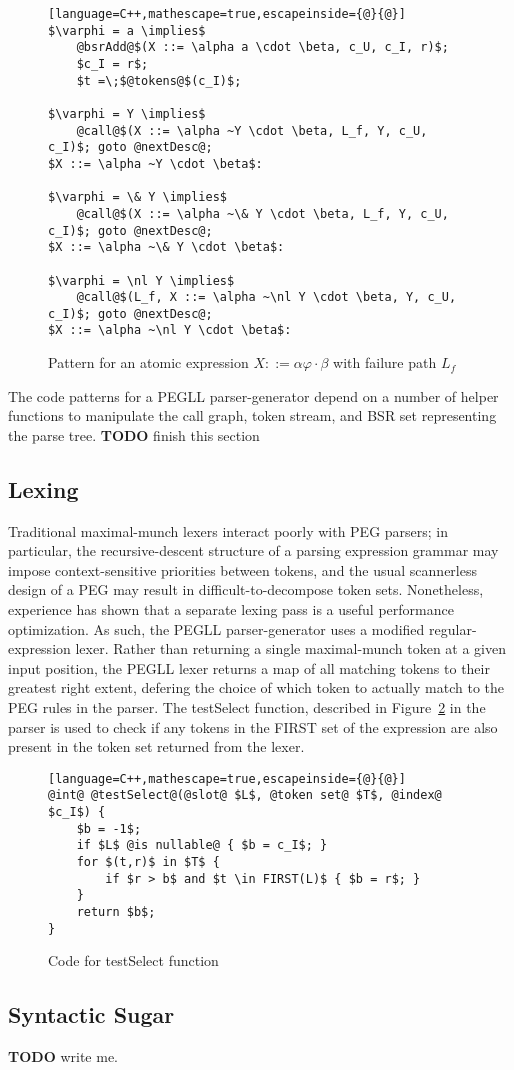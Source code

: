 \documentclass{article}
\newcommand{\nl}{\mathord{!}}
\begin{document}
\begin{figure}
\caption[Atomic expression code patterns]{Pattern for an atomic expression $X ::= \alpha \varphi \cdot \beta$ with failure path $L_f$} \label{atom-expr-pattern}
\begin{lstlisting}[language=C++,mathescape=true,escapeinside={@}{@}]
$\varphi = a \implies$
	@bsrAdd@$(X ::= \alpha a \cdot \beta, c_U, c_I, r)$;
	$c_I = r$;
	$t =\;$@tokens@$(c_I)$;

$\varphi = Y \implies$
	@call@$(X ::= \alpha ~Y \cdot \beta, L_f, Y, c_U, c_I)$; goto @nextDesc@;
$X ::= \alpha ~Y \cdot \beta$:

$\varphi = \& Y \implies$
	@call@$(X ::= \alpha ~\& Y \cdot \beta, L_f, Y, c_U, c_I)$; goto @nextDesc@;
$X ::= \alpha ~\& Y \cdot \beta$:

$\varphi = \nl Y \implies$
	@call@$(L_f, X ::= \alpha ~\nl Y \cdot \beta, Y, c_U, c_I)$; goto @nextDesc@;
$X ::= \alpha ~\nl Y \cdot \beta$:
\end{lstlisting}
\end{figure}

The code patterns for a PEGLL parser-generator depend on a number of helper functions to manipulate the call graph, token stream, and BSR set representing the parse tree. 
\textbf{TODO} finish this section

\subsection{Lexing}
Traditional maximal-munch lexers interact poorly with PEG parsers; in particular, the recursive-descent structure of a parsing expression grammar may impose context-sensitive priorities between tokens, and the usual scannerless design of a PEG may result in difficult-to-decompose token sets. 
Nonetheless, experience \cite{Ack19,Lau19} has shown that a separate lexing pass is a useful performance optimization.
As such, the PEGLL parser-generator uses a modified regular-expression lexer. 
Rather than returning a single maximal-munch token at a given input position, the PEGLL lexer returns a map of all matching tokens to their greatest right extent, defering the choice of which token to actually match to the PEG rules in the parser. 
The testSelect function, described in Figure~\ref{test-select} in the parser is used to check if any tokens in the FIRST set of the expression \cite{Red09} are also present in the token set returned from the lexer.

\begin{figure}
\caption[testSelect]{Code for testSelect function} \label{test-select}
\begin{lstlisting}[language=C++,mathescape=true,escapeinside={@}{@}]
@int@ @testSelect@(@slot@ $L$, @token set@ $T$, @index@ $c_I$) {
	$b = -1$;
	if $L$ @is nullable@ { $b = c_I$; }
	for $(t,r)$ in $T$ {
		if $r > b$ and $t \in FIRST(L)$ { $b = r$; }
	}
	return $b$;
}
\end{lstlisting}
\end{figure}

\subsection{Syntactic Sugar} \label{syntax-sec}

\textbf{TODO} write me.



\end{document}
